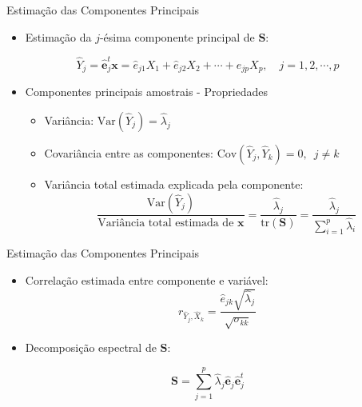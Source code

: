 \documentclass[
  ignorenonframetext,
  aspectratio=169,
]{beamer}
\providecommand{\tightlist}{%
  \setlength{\itemsep}{0pt}\setlength{\parskip}{0pt}}
\begin{document}
\begin{frame}{Estimação das Componentes Principais}
\label{estimauxe7uxe3o-das-componentes-principais-1}
\begin{itemize}
\tightlist
\item
  Estimação da \(j\)-ésima componente principal de \(\boldsymbol{S}\):
\end{itemize}

\[\hat{Y}_j = {\hat{\boldsymbol{e}}_j^t}\mathbf{x} =  \hat{e}_{j1}X_1 + \hat{e}_{j2}X_2 + \cdots + \hat{e}_{jp}X_p, \,\,\,\,\,\, j = 1, 2, \cdots, p\]

\pause

\begin{itemize}
\tightlist
\item
  Componentes principais amostrais - Propriedades

  \begin{itemize}
  \tightlist
  \item
    Variância: \(\text{Var}(\hat{Y}_j) = \hat{\lambda}_j\)
  \item
    Covariância entre as componentes:
    \(\text{Cov}(\hat{Y}_j, \hat{Y}_k) = 0, \,\,\, j \neq k\)
  \item
    Variância total estimada explicada pela componente:
    \[\dfrac{\text{Var}(\hat{Y}_j)}{\text{Variância total estimada de } \mathbf{x}} = \dfrac{\hat{\lambda}_j}{\text{tr}(\boldsymbol{S})} =  \dfrac{\hat{\lambda}_j}{\sum \limits_{i=1}^p \hat{\lambda}_i}\]
  \end{itemize}
\end{itemize}
\end{frame}

\begin{frame}{Estimação das Componentes Principais}
\label{estimauxe7uxe3o-das-componentes-principais-2}
\begin{itemize}
\tightlist
\item
  Correlação estimada entre componente e variável:
  \[r_{\hat{Y}_j,\hat{X}_k} = \displaystyle{\frac{\hat{e}_{jk} \sqrt{\hat{\lambda}_j}}{\sqrt{\sigma_{kk}}}}\]
\end{itemize}

\pause

\begin{itemize}
\tightlist
\item
  Decomposição espectral de \(\boldsymbol{S}\):
\end{itemize}

\[\boldsymbol{S} = \displaystyle \sum_{j=1}^p \hat{\lambda}_j  \hat{\boldsymbol{e}}_j  \hat{\boldsymbol{e}}_j^t\]
\end{frame}
\end{document}
